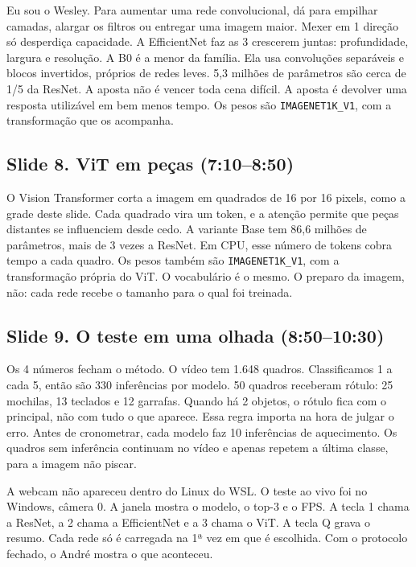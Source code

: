 \documentclass[12pt,a4paper]{article}
\begin{document}
Eu sou o Wesley. Para aumentar uma rede convolucional, dá para empilhar camadas, alargar os
filtros ou entregar uma imagem maior. Mexer em 1 direção só desperdiça capacidade. A EfficientNet
faz as 3 crescerem juntas: profundidade, largura e resolução. A B0 é a menor da família. Ela usa
convoluções separáveis e blocos invertidos, próprios de redes leves. 5,3 milhões de parâmetros
são cerca de 1/5 da ResNet. A aposta não é vencer toda cena difícil. A aposta é devolver uma
resposta utilizável em bem menos tempo. Os pesos são \texttt{IMAGENET1K\_V1}, com a transformação
que os acompanha.

\subsection*{Slide 8. ViT em peças (7:10--8:50)}

O Vision Transformer corta a imagem em quadrados de 16 por 16 pixels, como a grade deste slide.
Cada quadrado vira um token, e a atenção permite que peças distantes se influenciem desde cedo.
A variante Base tem 86,6 milhões de parâmetros, mais de 3 vezes a ResNet. Em CPU, esse número de
tokens cobra tempo a cada quadro. Os pesos também são \texttt{IMAGENET1K\_V1}, com a transformação
própria do ViT. O vocabulário é o mesmo. O preparo da imagem, não: cada rede recebe o tamanho
para o qual foi treinada.

\subsection*{Slide 9. O teste em uma olhada (8:50--10:30)}

Os 4 números fecham o método. O vídeo tem 1.648 quadros. Classificamos 1 a cada 5, então são
330 inferências por modelo. 50 quadros receberam rótulo: 25 mochilas, 13 teclados e 12 garrafas.
Quando há 2 objetos, o rótulo fica com o principal, não com tudo o que aparece. Essa regra importa
na hora de julgar o erro. Antes de cronometrar, cada modelo faz 10 inferências de aquecimento.
Os quadros sem inferência continuam no vídeo e apenas repetem a última classe, para a imagem não piscar.

A webcam não apareceu dentro do Linux do WSL. O teste ao vivo foi no Windows, câmera 0. A janela
mostra o modelo, o top-3 e o FPS. A tecla 1 chama a ResNet, a 2 chama a EfficientNet e a 3 chama
o ViT. A tecla Q grava o resumo. Cada rede só é carregada na 1ª vez em que é escolhida. Com o
protocolo fechado, o André mostra o que aconteceu.
\end{document}
